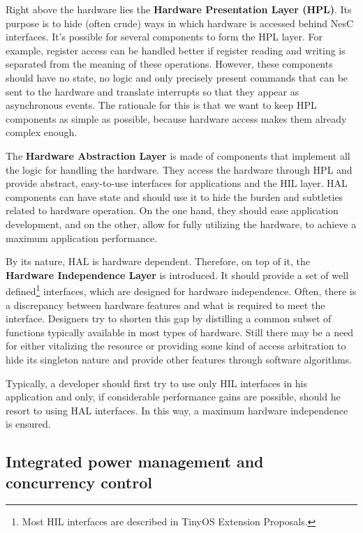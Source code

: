 Right above the hardware lies the {\bf Hardware Presentation Layer (HPL)}. Its purpose is to hide (often crude) ways in which hardware is accessed behind NesC interfaces. It's possible for several components to form the HPL layer. For example, register access can be handled better if register reading and writing is separated from the meaning of these operations. However, these components should have no state, no logic and only precisely present commands that can be sent to the hardware and translate interrupts so that they appear as asynchronous events. The rationale for this is that we want to keep HPL components as simple as possible, because hardware access makes them already complex enough.

The {\bf Hardware Abstraction Layer} is made of components that implement all the logic for handling the hardware. They access the hardware through HPL and provide abstract, easy-to-use interfaces for applications and the HIL layer. HAL components can have state and should use it to hide the burden and subtleties related to hardware operation. On the one hand, they should ease application development, and on the other, allow for fully utilizing the hardware, to achieve a maximum application performance.

By its nature, HAL is hardware dependent. Therefore, on top of it, the {\bf Hardware Independence Layer} is introduced. It should provide a set of well defined\footnote{Most HIL interfaces are described in TinyOS Extension Proposals.} interfaces, which are designed for hardware independence. Often, there is a discrepancy between hardware features and what is required to meet the interface.  Designers try to shorten this gap by distilling a common subset of functions typically available in most types of hardware. Still there may be a need for either vitalizing the resource or providing some kind of access arbitration to hide its singleton nature and provide other features through software algorithms.

Typically, a developer should first try to use only HIL interfaces in his application and only, if considerable performance gains are possible, should he resort to using HAL interfaces. In this way, a maximum hardware independence is ensured.

\subsection{Integrated power management and concurrency control}
\label{ch:concurrency_and_power}

